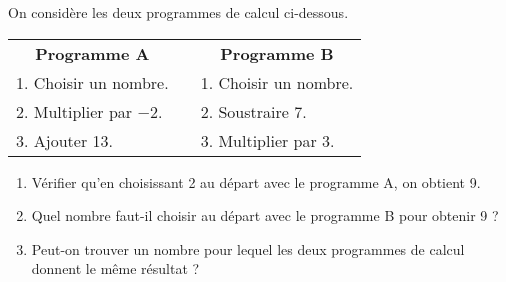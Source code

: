 
\medskip

On considère les deux programmes de calcul ci-dessous. 

\begin{center}
\begin{tabularx}{0.75\linewidth}{|X|m{0.4cm}|X|}\cline{1-1}\cline{3-3}
\multicolumn{1}{|c|}{\textbf{Programme A}}&&\multicolumn{1}{|c|}{\textbf{Programme B}}\\\cline{1-1}\cline{3-3}  
1. Choisir un nombre.&&1. Choisir un nombre. \\ 
2. Multiplier par $-2$.&&2. Soustraire 7.  \\
3. Ajouter 13.&&3.  Multiplier par 3. \\\cline{1-1}\cline{3-3}
\end{tabularx}
\end{center} 

\begin{enumerate}
\item Vérifier qu'en choisissant 2 au départ avec le programme A, on obtient 9. 
\item Quel nombre faut-il choisir au départ avec le programme B pour obtenir 9 ? 
\item Peut-on trouver un nombre pour lequel les deux programmes de calcul donnent le même résultat ? 
\end{enumerate} 

\bigskip

